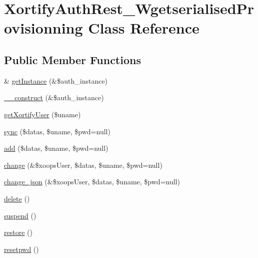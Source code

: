 \hypertarget{class_xortify_auth_rest___wgetserialised_provisionning}{\section{Xortify\-Auth\-Rest\-\_\-\-Wgetserialised\-Provisionning Class Reference}
\label{class_xortify_auth_rest___wgetserialised_provisionning}
}
\subsection*{Public Member Functions}
\begin{DoxyCompactItemize}
\item 
\& \hyperlink{class_xortify_auth_rest___wgetserialised_provisionning_a2c8eaa915c70d75289ac8a03686194f9}{get\-Instance} (\&\$auth\-\_\-instance)
\item 
\hyperlink{class_xortify_auth_rest___wgetserialised_provisionning_a0f25832dc86774e7605b81fe57b083c2}{\-\_\-\-\_\-construct} (\&\$auth\-\_\-instance)
\item 
\hyperlink{class_xortify_auth_rest___wgetserialised_provisionning_a041d726ac26672547ed1504e8e0117aa}{get\-Xortify\-User} (\$uname)
\item 
\hyperlink{class_xortify_auth_rest___wgetserialised_provisionning_a35dc08b0f2138eb818ff95345b73bcff}{sync} (\$datas, \$uname, \$pwd=null)
\item 
\hyperlink{class_xortify_auth_rest___wgetserialised_provisionning_adfc9fcef01e7bd7b2f47e8e79d51fc63}{add} (\$datas, \$uname, \$pwd=null)
\item 
\hyperlink{class_xortify_auth_rest___wgetserialised_provisionning_ae1f0971b9712c794620cf309164e43af}{change} (\&\$xoops\-User, \$datas, \$uname, \$pwd=null)
\item 
\hyperlink{class_xortify_auth_rest___wgetserialised_provisionning_a94f4e0408f26e65abca347ec883f4ec9}{change\-\_\-json} (\&\$xoops\-User, \$datas, \$uname, \$pwd=null)
\item 
\hyperlink{class_xortify_auth_rest___wgetserialised_provisionning_a13bdffdd926f26b825ea57066334ff01}{delete} ()
\item 
\hyperlink{class_xortify_auth_rest___wgetserialised_provisionning_ad73006a505121228f3b075c2409787d2}{suspend} ()
\item 
\hyperlink{class_xortify_auth_rest___wgetserialised_provisionning_aa1371f22826cf8cde4454c9b467203d0}{restore} ()
\item 
\hyperlink{class_xortify_auth_rest___wgetserialised_provisionning_a06d70fbd3a2db390b6f2530c0076628e}{resetpwd} ()
\end{DoxyCompactItemize}
